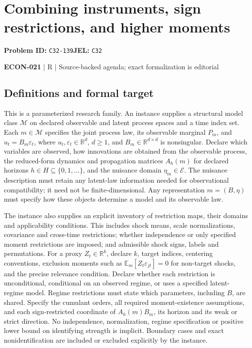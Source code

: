 \documentclass[11pt,a4paper]{article}
\newcommand{\R}{\mathbb R}
\begin{document}
\section*{Combining instruments, sign restrictions, and higher moments}
\textbf{Problem ID:} \texttt{C32-139}\quad \textbf{JEL:} \texttt{C32}\par
\label{problem:OP-0605}


\label{audited:ECON-021}

{\sffamily\small\color{muted}\textbf{ECON-021} | R | Source-backed agenda; exact formalization is editorial\par}

\subsection*{Definitions and formal target}

This is a parameterized research family. An instance supplies a structural model class \(\mathcal M\) on declared observable and latent process spaces and a time index set. Each \(m\in\mathcal M\) specifies the joint process law, its observable marginal \(P_m\), and \(u_t=B_m\varepsilon_t\), where \(u_t,\varepsilon_t\in\R^d\), \(d\geq1\), and \(B_m\in\R^{d\times d}\) is nonsingular. Declare which variables are observed, how innovations are obtained from the observable process, the reduced-form dynamics and propagation matrices \(A_h(m)\) for declared horizons \(h\in H\subseteq\{0,1,\ldots\}\), and the nuisance domain \(\eta_m\in\mathcal E\). The nuisance description must retain any latent-law information needed for observational compatibility; it need not be finite-dimensional. Any representation \(m=(B,\eta)\) must specify how these objects determine a model and its observable law.

The instance also supplies an explicit inventory of restriction maps, their domains and applicability conditions. This includes shock means, scale normalizations, covariance and cross-time restrictions; whether independence or only specified moment restrictions are imposed; and admissible shock signs, labels and permutations. For a proxy \(Z_t\in\R^k\), declare \(k\), target indices, centering conventions, exclusion moments such as \(\mathbb E_m[Z_t\varepsilon_{jt}]=0\) for non-target shocks, and the precise relevance condition. Declare whether each restriction is unconditional, conditional on an observed regime, or uses a specified latent-regime model. Regime restrictions must state which parameters, including \(B\), are shared. Specify the cumulant orders, all required moment-existence assumptions, and each sign-restricted coordinate of \(A_h(m)B_m\), its horizon and its weak or strict direction. No independence, normalization, regime specification or positive lower bound on identifying strength is implicit. Boundary cases and exact nonidentification are included or excluded explicitly by the instance.
\end{document}

